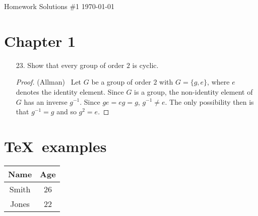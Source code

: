 \documentclass[10pt]{article}
\newcommand\header{{\sc 631 Homework Solutions \#1 \hfill \today}}
\begin{document}
\header

\section*{Chapter 1}

\begin{itemize}

\item[23.]  Show that every group of order $2$ is cyclic.

\begin{proof}(Allman) \ Let $G$ be a group of order $2$ with
$G = \{g, e\}$, where $e$ denotes the identity element.
Since $G$ is a group, the non-identity element of $G$  has
an inverse $g^{-1}$.  Since $g e = eg = g$, $g^{-1} \neq e$.
The only possibility then is that $g^{-1} = g$ and so $g^2 = e$.
\end{proof}

\end{itemize}

\section*{\TeX ~examples}


\begin{center}
\begin{tabular}{cc}
Name & Age\\
\hline
Smith & 26\\
Jones & 22\\
\end{tabular}
\end{center}
\end{document}
